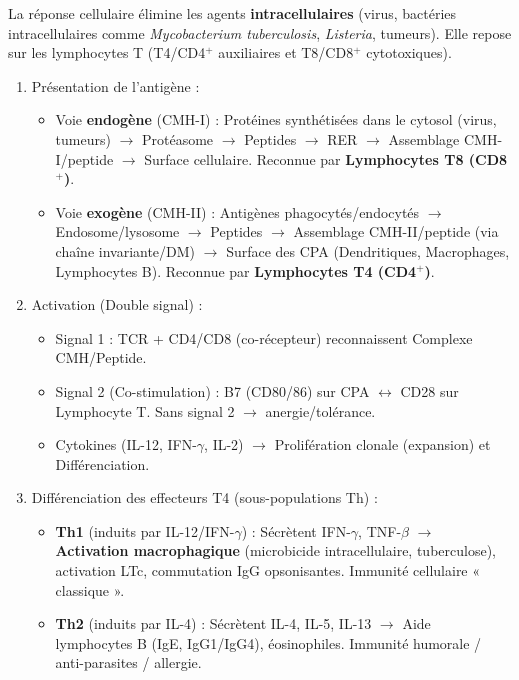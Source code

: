 \documentclass[11pt]{article}
\newcommand{\cle}[1]{{\popxbold\color{popdark}#1}}
\begin{document}
\begin{methode}
La réponse cellulaire élimine les agents \textbf{intracellulaires} (virus, bactéries intracellulaires comme \emph{Mycobacterium tuberculosis}, \emph{Listeria}, tumeurs). Elle repose sur les lymphocytes T (T4/CD4$^{+}$ auxiliaires et T8/CD8$^{+}$ cytotoxiques).
\begin{enumerate}
\item \cle{Présentation de l'antigène} : 
\begin{itemize}
\item Voie \textbf{endogène} (CMH-I) : Protéines synthétisées dans le cytosol (virus, tumeurs) $\rightarrow$ Protéasome $\rightarrow$ Peptides $\rightarrow$ RER $\rightarrow$ Assemblage CMH-I/peptide $\rightarrow$ Surface cellulaire. Reconnue par \textbf{Lymphocytes T8 (CD8$^{+}$)}.
\item Voie \textbf{exogène} (CMH-II) : Antigènes phagocytés/endocytés $\rightarrow$ Endosome/lysosome $\rightarrow$ Peptides $\rightarrow$ Assemblage CMH-II/peptide (via chaîne invariante/DM) $\rightarrow$ Surface des CPA (Dendritiques, Macrophages, Lymphocytes B). Reconnue par \textbf{Lymphocytes T4 (CD4$^{+}$)}.
\end{itemize}
\item \cle{Activation (Double signal)} : 
\begin{itemize}
\item Signal 1 : TCR + CD4/CD8 (co-récepteur) reconnaissent Complexe CMH/Peptide.
\item Signal 2 (Co-stimulation) : B7 (CD80/86) sur CPA $\leftrightarrow$ CD28 sur Lymphocyte T. Sans signal 2 $\rightarrow$ anergie/tolérance.
\item Cytokines (IL-12, IFN-$\gamma$, IL-2) $\rightarrow$ Prolifération clonale (expansion) et Différenciation.
\end{itemize}
\item \cle{Différenciation des effecteurs T4 (sous-populations Th)} :
\begin{itemize}
\item \textbf{Th1} (induits par IL-12/IFN-$\gamma$) : Sécrètent IFN-$\gamma$, TNF-$\beta$ $\rightarrow$ \textbf{Activation macrophagique} (microbicide intracellulaire, tuberculose), activation LTc, commutation IgG opsonisantes. Immunité cellulaire « classique ».
\item \textbf{Th2} (induits par IL-4) : Sécrètent IL-4, IL-5, IL-13 $\rightarrow$ Aide lymphocytes B (IgE, IgG1/IgG4), éosinophiles. Immunité humorale / anti-parasites / allergie.

\end{itemize}
\end{enumerate}
\end{methode}
\end{document}

